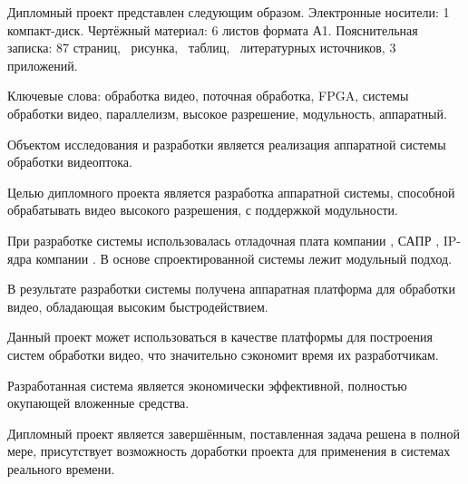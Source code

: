 \thispagestyle{empty}

Дипломный проект представлен следующим образом. Электронные носители: 1 компакт-диск.
Чертёжный материал: 6 листов формата А1. Пояснительная записка: 87 страниц, \totfig{}~рисунка,
\tottab{}~таблиц, \totref{}~литературных источников, 3 приложений.

Ключевые слова: обработка видео, поточная обработка, FPGA, системы обработки видео,
параллелизм, высокое разрешение, модульность, аппаратный.

Объектом исследования и разработки является реализация аппаратной системы обработки видеоптока.

Целью дипломного проекта является разработка аппаратной системы, способной обрабатывать видео высокого
разрешения, с поддержкой модульности.

При разработке системы использовалась отладочная плата компании , САПР ,
IP-ядра компании . В основе спроектированной системы лежит модульный подход.

В результате разработки системы получена аппаратная платформа для обработки видео, обладающая высоким
быстродействием.

Данный проект может использоваться в качестве платформы для построения систем обработки видео,
что значительно сэкономит время их разработчикам.

Разработанная система является экономически эффективной, полностью окупающей вложенные средства.

Дипломный проект является завершённым, поставленная задача решена в полной мере, присутствует возможность
доработки проекта для применения в системах реального времени.

\clearpage
